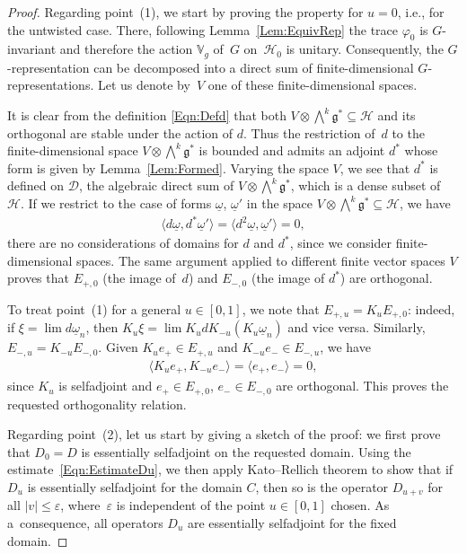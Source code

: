 \documentclass[11pt]{article}
\newcommand{\Core}{C}
\newcommand{\Dd}{\mathscr{D}}
\newcommand{\Hh}{\mathscr{H}}
\newcommand{\LieG}{\mathfrak{g}}
\newcommand{\omegat}{\underline{\omega}}
\newcommand{\RepV}{\mathbb{V}}
\numberwithin{equation}{section}
\begin{document}
\begin{proof}
Regarding point~(1), %
we start by proving the property for $u = 0$, i.e., for the untwisted case. There, following Lemma~\ref{Lem:EquivRep} the trace $\varphi_0$ is $G$-invariant and therefore the action $\RepV_g$ of~$G$ on~$\Hh_0$ is unitary. Consequently, the $G$-representation can be decomposed into a direct sum of f\/inite-dimensional $G$-representations. Let us denote by~$V$ one of these f\/inite-dimensional spaces.

It is clear from the def\/inition \eqref{Eqn:Defd} that both $V \otimes \bigwedge^k \LieG^* \subseteq \Hh$ and its orthogonal are stable under the action of $d$. Thus the restriction of~$d$ to the f\/inite-dimensional space $V \otimes \bigwedge^k \LieG^*$ is bounded and admits an adjoint $d^*$ whose form is given by Lemma~\ref{Lem:Formed}. Varying the space $V$, we see that $d^*$ is def\/ined on $\Dd$, the algebraic direct sum of $V \otimes \bigwedge^k \LieG^*$, which is a dense subset of~$\Hh$. If we restrict to the case of forms $\omegat$, $\omegat'$ in the space $V \otimes \bigwedge^k \LieG^* \subseteq \Hh$, we have
\begin{gather*}
\langle d \omegat, d^* \omegat' \rangle = \langle d^2 \omegat, \omegat' \rangle = 0,
\end{gather*}
there are no considerations of domains for $d$ and $d^*$, since we consider f\/inite-dimensional spaces. The same argument applied to dif\/ferent f\/inite vector spaces $V$ proves that $E_{+,0}$ (the image of~$d$) and $E_{-,0}$ (the image of $d^*$) are orthogonal.

To treat point~(1) %
for a general $u \in [0,1]$, we note that $E_{+,u} = K_u E_{+,0}$: indeed, if $\xi = \lim d \omegat_n$, then $K_u \xi = \lim K_u d K_{-u} (K_u \omegat_n)$ and vice versa. Similarly, $E_{-,u} = K_{-u} E_{-,0}$. Given $K_u e_+ \in E_{+,u}$ and $K_{-u} e_- \in E_{-,u}$, we have
\begin{gather*}
\langle K_u e_+, K_{-u} e_- \rangle = \langle e_+, e_- \rangle = 0,
\end{gather*}
since $K_u$ is selfadjoint and $e_+ \in E_{+,0}$, $e_- \in E_{-,0}$ are orthogonal. This proves the requested orthogonality relation.

Regarding point~(2), %
let us start by giving a sketch of the proof: we f\/irst prove that $D_0 = D$ is essentially selfadjoint on the requested domain. Using the estimate~\eqref{Eqn:EstimateDu}, we then apply Kato--Rellich theorem to show that if $D_{u}$ is essentially selfadjoint for the domain $\Core$, then so is the operator $D_{u + v}$ for all $|v| \leqslant \varepsilon$, where~$\varepsilon$ is independent of the point $u \in [0,1]$ chosen. As a~consequence, all operators $D_u$ are essentially selfadjoint for the f\/ixed domain.


\end{proof}
\end{document}
